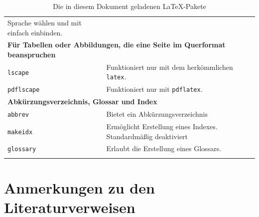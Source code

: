 \begin{longtable}{p{}p{}}
Sprache wählen und mit
\verb!! einfach einbinden.\\
\multicolumn{2}{l}{\bf Für Tabellen oder Abbildungen, die eine Seite im
Querformat beanspruchen}\\
\texttt{lscape}		& Funktioniert nur mit dem herkömmlichen \verb!latex!.\\
\texttt{pdflscape}	& Funktioniert nur mit \verb!pdflatex!.\\
\multicolumn{2}{l}{\bf Abkürzungsverzeichnis, Glossar und Index}\\
\texttt{abbrev}		& Bietet ein Abkürzungsverzeichnis\\
\texttt{makeidx}		& Ermöglicht Erstellung eines Indexes.
Standardmäßig deaktiviert\\
\texttt{glossary} & Erlaubt die Erstellung eines Glossars.\\
\bottomrule
\caption{Die in diesem Dokument geladenen \LaTeX-Pakete}\label{tab:Pakete}
\end{longtable}


\section{Anmerkungen zu den Literaturverweisen}
\label{sec:HinweiseLiteratur}

